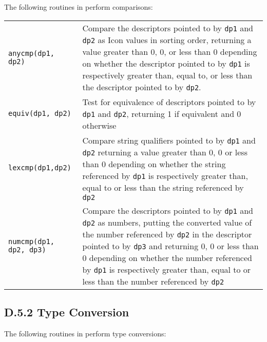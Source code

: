 The following routines in  perform comparisons:

\begin{xtabular}{l@{\hspace{1cm}}p{11cm}}

\texttt{anycmp(dp1, dp2)} &
Compare the descriptors pointed to by \texttt{dp1} and \texttt{dp2} as Icon
values in sorting order, returning a value greater than 0, 0, or less than 0
depending on whether the descriptor pointed to by \texttt{dp1} is respectively greater
than, equal to, or less than the descriptor pointed to by \texttt{dp2}.\\

\texttt{equiv(dp1, dp2)} &
Test for equivalence of descriptors pointed to by \texttt{dp1} and \texttt{dp2},
returning 1 if equivalent and 0 otherwise\\

\texttt{lexcmp(dp1,dp2)} &
Compare string qualifiers pointed to by \texttt{dp1} and \texttt{dp2} returning
a value greater than 0, 0 or less than 0 depending on whether the string
referenced by \texttt{dp1} is respectively greater than, equal to or less than
the string referenced by \texttt{dp2}\\

\texttt{numcmp(dp1, dp2, dp3)} &
Compare the descriptors pointed to by \texttt{dp1} and \texttt{dp2} as numbers,
putting the converted value of the number referenced by \texttt{dp2} in the
descriptor pointed to by \texttt{dp3} and returning 0, 0 or less than 0
depending on whether the number referenced by \texttt{dp1} is respectively
greater than, equal to or less than the number referenced by \texttt{dp2}\\

\end{xtabular}

\subsection[D.5.2 Type Conversion]{D.5.2 Type Conversion}

The following routines in  perform type conversions:


